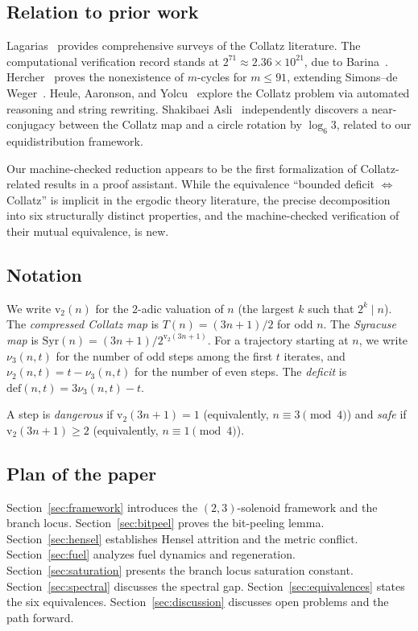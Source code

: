 \documentclass{CUP-JNL-FMP}%
\theoremstyle{definition}
\numberwithin{equation}{section}
\newcommand{\Syr}{\mathrm{Syr}}
\newcommand{\val}{\mathrm{v}_2}
\newcommand{\deficit}{\mathrm{def}}
\begin{document}
\subsection{Relation to prior work}

Lagarias~\cite{Lagarias2003,Lagarias2010} provides comprehensive surveys of the
Collatz literature. The computational verification record stands at
$2^{71} \approx 2.36 \times 10^{21}$, due to Barina~\cite{Barina2025}.
Hercher~\cite{Hercher2023} proves the nonexistence of $m$-cycles for $m \leq 91$,
extending Simons--de Weger~\cite{SimonsDeWeger2005}. Heule, Aaronson, and
Yolcu~\cite{HeuleAaronsonYolcu2023} explore the Collatz problem via automated
reasoning and string rewriting. Shakibaei Asli~\cite{ShakibaeiAsli2026} independently
discovers a near-conjugacy between the Collatz map and a circle rotation by
$\log_6 3$, related to our equidistribution framework.

Our machine-checked reduction appears to be the first formalization of Collatz-related
results in a proof assistant. While the equivalence ``bounded deficit $\Leftrightarrow$
Collatz'' is implicit in the ergodic theory literature, the precise decomposition into
six structurally distinct properties, and the machine-checked verification of their
mutual equivalence, is new.

\subsection{Notation}

We write $\val(n)$ for the $2$-adic valuation of $n$ (the largest $k$ such that
$2^k \mid n$). The \emph{compressed Collatz map} is $T(n) = (3n+1)/2$ for odd $n$.
The \emph{Syracuse map} is $\Syr(n) = (3n+1)/2^{\val(3n+1)}$. For a trajectory
starting at $n$, we write $\nu_3(n,t)$ for the number of odd steps among the first
$t$ iterates, and $\nu_2(n,t) = t - \nu_3(n,t)$ for the number of even steps. The
\emph{deficit} is $\deficit(n,t) = 3\nu_3(n,t) - t$.

A step is \emph{dangerous} if $\val(3n+1) = 1$ (equivalently, $n \equiv 3 \pmod{4}$)
and \emph{safe} if $\val(3n+1) \geq 2$ (equivalently, $n \equiv 1 \pmod{4}$).

\subsection{Plan of the paper}

Section~\ref{sec:framework} introduces the $(2,3)$-solenoid framework and the
branch locus. Section~\ref{sec:bitpeel} proves the bit-peeling lemma.
Section~\ref{sec:hensel} establishes Hensel attrition and the metric conflict.
Section~\ref{sec:fuel} analyzes fuel dynamics and regeneration.
Section~\ref{sec:saturation} presents the branch locus saturation constant.
Section~\ref{sec:spectral} discusses the spectral gap.
Section~\ref{sec:equivalences} states the six equivalences.
Section~\ref{sec:discussion} discusses open problems and the path forward.
\end{document}

